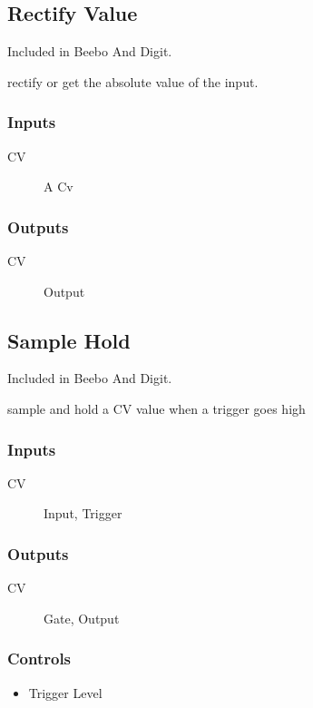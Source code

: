 \subsection{Rectify Value}

Included in Beebo And Digit.

rectify or get the absolute value of the input. 



\subsubsection{Inputs}
\begin{description}
\item [CV] A Cv
\end{description}

\subsubsection{Outputs}
\begin{description}
\item [CV] Output
\end{description}

\subsection{Sample Hold}

Included in Beebo And Digit.

sample and hold a CV value when a trigger goes high



\subsubsection{Inputs}
\begin{description}
\item [CV] Input, Trigger
\end{description}

\subsubsection{Outputs}
\begin{description}
\item [CV] Gate, Output
\end{description}

\subsubsection{Controls}
\begin{itemize}
\item Trigger Level
\end{itemize}

